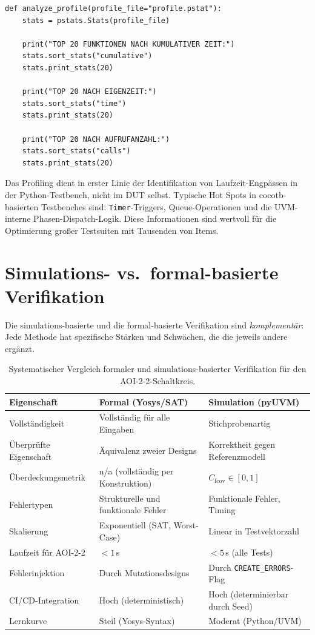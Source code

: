﻿\documentclass[12pt,a4paper]{report}
\begin{document}
\begin{lstlisting}[style=pythonstyle, caption={\texttt{analyze\_profile.py}: Auswertung der Profil-Daten}]
def analyze_profile(profile_file="profile.pstat"):
    stats = pstats.Stats(profile_file)

    print("TOP 20 FUNKTIONEN NACH KUMULATIVER ZEIT:")
    stats.sort_stats("cumulative")
    stats.print_stats(20)

    print("TOP 20 NACH EIGENZEIT:")
    stats.sort_stats("time")
    stats.print_stats(20)

    print("TOP 20 NACH AUFRUFANZAHL:")
    stats.sort_stats("calls")
    stats.print_stats(20)
\end{lstlisting}

Das Profiling dient in erster Linie der Identifikation von Laufzeit-Engpässen
in der Python-Testbench, nicht im DUT selbst. Typische Hot Spots in cocotb-
basierten Testbenches sind: \texttt{Timer}-Triggers, Queue-Operationen und
die UVM-interne Phasen-Dispatch-Logik. Diese Informationen sind wertvoll für
die Optimierung großer Testsuiten mit Tausenden von Items.

\section{Simulations- vs.\ formal-basierte Verifikation}
\label{subsec:vergleich_sim_formal}

Die simulations-basierte und die formal-basierte Verifikation sind \emph{komplementär}:
Jede Methode hat spezifische Stärken und Schwächen, die die jeweils andere ergänzt.

\begin{table}[H]
\centering
\small
\begin{tabular}{|l|p{3.8cm}|p{3.8cm}|}
\hline
\textbf{Eigenschaft} & \textbf{Formal (Yosys/SAT)} & \textbf{Simulation (pyUVM)} \\
\hline
Vollständigkeit & Vollständig für alle Eingaben & Stichprobenartig \\
Überprüfte Eigenschaft & Äquivalenz zweier Designs & Korrektheit gegen Referenzmodell \\
Überdeckungsmetrik & n/a (vollständig per Konstruktion) & $C_{\mathrm{fcov}} \in [0,1]$ \\
Fehlertypen & Strukturelle und funktionale Fehler & Funktionale Fehler, Timing \\
Skalierung & Exponentiell (SAT, Worst-Case) & Linear in Testvektorzahl \\
Laufzeit für AOI-2-2 & $< 1\,$s & $< 5\,$s (alle Tests) \\
Fehlerinjektion & Durch Mutationsdesigns & Durch \texttt{CREATE\_ERRORS}-Flag \\
CI/CD-Integration & Hoch (deterministisch) & Hoch (determinierbar durch Seed) \\
Lernkurve & Steil (Yosys-Syntax) & Moderat (Python/UVM) \\
\hline
\end{tabular}
\caption{Systematischer Vergleich formaler und simulations-basierter Verifikation für den AOI-2-2-Schaltkreis.}
\label{tab:sim_formal_vergleich}
\end{table}
\end{document}
